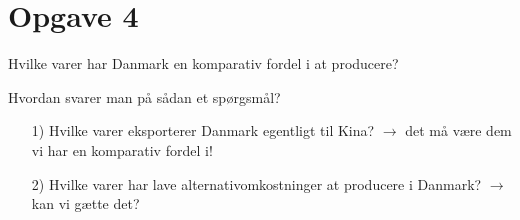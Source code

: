 \section{Opgave 4}

\begin{frame}{Hvilke varer har Danmark en komparativ fordel i at producere?}

Hvordan svarer man på sådan et spørgsmål?
\begin{itemize}
  \item[1)] Hvilke varer eksporterer Danmark egentligt til Kina? $\rightarrow$ det må være dem vi har en komparativ fordel i!
  \item[2)] Hvilke varer har lave alternativomkostninger at producere i Danmark? $\rightarrow$ kan vi gætte det?
\end{itemize}

\end{frame}
